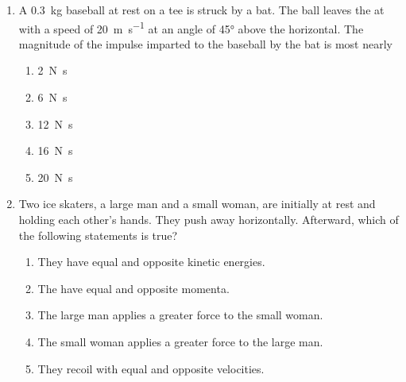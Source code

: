 \documentclass{../../../oss-apphys}
\begin{document}
\begin{multicols}{2}
\begin{enumerate}[leftmargin=18pt,resume]
    
  \item A \SI{.3}{\kilo\gram} baseball at rest on a tee is struck by a bat. The
    ball leaves the at with a speed of \SI{20}{\metre\per\second} at an angle
    of \ang{45} above the horizontal. The magnitude of the impulse imparted to
    the baseball by the bat is most nearly
    \begin{enumerate}[noitemsep,topsep=0pt,leftmargin=18pt,label=(\Alph*)]
    \item\SI{2}{\newton\second}
    \item\SI{6}{\newton\second}
    \item\SI{12}{\newton\second}
    \item\SI{16}{\newton\second}
    \item\SI{20}{\newton\second}
    \end{enumerate}
    
  \item Two ice skaters, a large man and a small woman, are initially at rest
    and holding each other's hands. They push away horizontally. Afterward,
    which of the following statements is true?
    \begin{enumerate}[noitemsep,topsep=0pt,leftmargin=18pt,label=(\Alph*)]
    \item They have equal and opposite kinetic energies.
    \item The have equal and opposite momenta.
    \item The large man applies a greater force to the small woman.
    \item The small woman applies a greater force to the large man.
    \item They recoil with equal and opposite velocities.
    \end{enumerate}
    

\end{enumerate}
\end{multicols}
\end{document}
